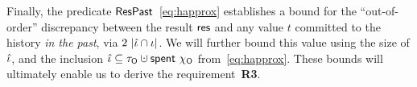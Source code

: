 Finally, the predicate $\mathsf{ResPast}$~\eqref{eq:happrox} establishes a
bound for the ``out-of-order'' discrepancy between the result $\mathsf{res}$
and any value $t$ committed to the history \emph{in the past}, via
$2~|\hat{\iota} \cap \iota|$. We will further bound this value using the size
of $\hat{\iota}$, and the inclusion $\iknh \subseteq \tkno \hunion
\Tomb~\histo$ from~\eqref{eq:happrox}. These bounds will ultimately
enable us to derive the requirement~\textbf{R3}.

 



